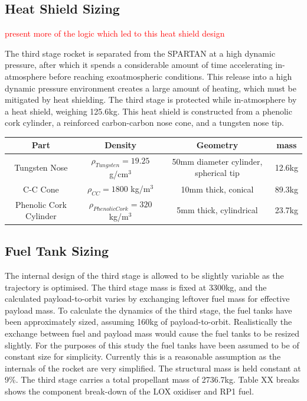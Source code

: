 \subsection{Heat Shield Sizing}
\textcolor{red}{present more of the logic which led to this heat shield design}

The third stage rocket is separated from the SPARTAN at a high dynamic pressure, after which it spends a considerable amount of time accelerating in-atmosphere before reaching exoatmospheric conditions. This release into a high dynamic pressure environment creates a large amount of heating, which must be mitigated by heat shielding. 
The third stage is protected while in-atmosphere by a heat shield, weighing 125.6kg. This heat shield is constructed from a phenolic cork cylinder, a reinforced carbon-carbon nose cone, and a tungsten nose tip. 


\begin{tabular}{|c|c|c|c|}
	\hline  Part & Density & Geometry & mass \\ 
	\hline  Tungsten Nose & $\rho_{Tungsten} = 19.25$  g/cm$^3$ & 50mm diameter cylinder, spherical tip & 12.6kg \\ 
		\hline C-C Cone & $\rho_{CC} = 1800$  kg/m$^3$ & 10mm thick, conical & 89.3kg \\ 
			\hline Phenolic Cork Cylinder & $\rho_{Phenolic Cork} = 320$  kg/m$^3$ & 5mm thick, cylindrical & 23.7kg \\ 
	\hline 
\end{tabular} 
		
		\subsection{Fuel Tank Sizing}
		The internal design of the third stage is allowed to be slightly variable as the trajectory is optimised. The third stage mass is fixed at 3300kg, and the calculated payload-to-orbit varies by exchanging leftover fuel mass for effective payload mass. To calculate the dynamics of the third stage, the fuel tanks have been approximately sized, assuming 160kg of payload-to-orbit. Realistically the exchange between fuel and payload mass would cause the fuel tanks to be resized slightly. For the purposes of this study the fuel tanks have been assumed to be of constant size for simplicity. Currently this is a reasonable assumption as the internals of the rocket are very simplified. The structural mass is held constant at 9\%. The third stage carries a total propellant mass of 2736.7kg. Table XX breaks shows the component break-down of the LOX oxidiser and RP1 fuel.  
		
